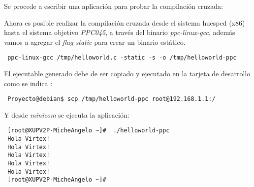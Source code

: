 Se procede a escribir una aplicación para probar la compilación cruzada:


Ahora es  posible realizar la compilación cruzada desde el sistema huesped (x86)
hasta el sistema objetivo \emph{PPC045}, a través del binario
\emph{ppc-linux-gcc}, además vamos a agregar el \emph{flag static} para crear un
binario estático.
\begin{verbatim}
 ppc-linux-gcc /tmp/helloworld.c -static -s -o /tmp/helloworld-ppc
\end{verbatim}

El ejecutable generado debe de ser copiado y ejecutado en la tarjeta de
desarrollo como se indica :

\begin{verbatim}
 Proyecto@debian$ scp /tmp/helloworld-ppc root@192.168.1.1:/
\end{verbatim}

Y desde \emph{minicom} se ejecuta la aplicación:

\begin{verbatim}
 [root@XUPV2P-MicheAngelo ~]#  ./helloworld-ppc
 Hola Virtex!
 Hola Virtex!
 Hola Virtex!
 Hola Virtex!
 Hola Virtex!
 [root@XUPV2P-MicheAngelo ~]#
\end{verbatim}



